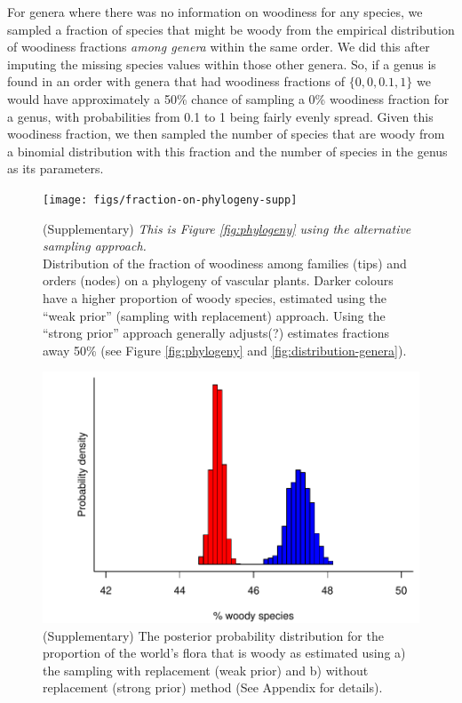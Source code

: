 \documentclass[12pt]{article}
\begin{document}
For genera where there was no information on woodiness for any
species, we sampled a fraction of species that might be woody from the
empirical distribution of woodiness fractions \textit{among genera}
within the same order.  We did this after imputing the missing species
values within those other genera.  So, if a genus is found in an order
with genera that had woodiness fractions of $\{0, 0, 0.1, 1\}$ we would
have approximately a 50\% chance of sampling a 0\% woodiness fraction
for a genus, with probabilities from 0.1 to 1 being fairly evenly
spread.  Given this woodiness fraction, we then sampled the number of
species that are woody from a binomial distribution with this fraction
and the number of species in the genus as its parameters.

\begin{figure}[p]
  \centering
  \texttt{[image: figs/fraction-on-phylogeny-supp]}

  \caption{(Supplementary)
    \textit{This is Figure \ref{fig:phylogeny} using the alternative
      sampling approach.}\\
    Distribution of the fraction of woodiness among families
    (tips) and orders (nodes) on a phylogeny of vascular plants.
    Darker colours have a higher proportion of woody species,
    estimated using the ``weak prior'' (sampling with
    replacement) approach.  Using the ``strong prior'' approach
    generally adjusts(?) estimates fractions away 50\% (see Figure
    \ref{fig:phylogeny} and \ref{fig:distribution-genera}).
    }
\label{fig:phylogeny-supp}
\end{figure}

\begin{figure}[p]
  \centering
  \includegraphics{figs/distribution-raw}  
  \caption{(Supplementary) The posterior probability distribution for
    the proportion of the world's flora that is woody as estimated
    using a) the sampling with replacement (weak prior) and b) without
    replacement (strong prior) method (See Appendix for details).}
  \label{fig:distribution-raw}
\end{figure}
\end{document}

